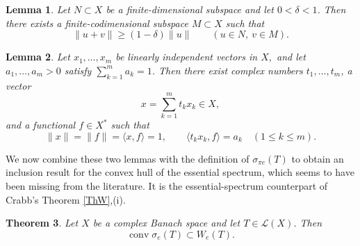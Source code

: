 \documentclass[11pt]{amsart}
\numberwithin{equation}{section}
\newtheorem{theorem}{Theorem}[section]
\newtheorem{lemma}[theorem]{Lemma}
\theoremstyle{definition}
\theoremstyle{remark}
\DeclareMathOperator{\conv}{conv}
\newcommand{\ip}[2]{\langle #1,#2\rangle}
\newcommand{\We}{W_e}
\begin{document}
\begin{lemma}\label{lem:separation-finite-codim}
Let $N\subset X$ be a finite-dimensional subspace and let $0<\delta<1$. Then there exists a finite-codimensional subspace $M\subset X$ such that
\[
\|u+v\|\ge (1-\delta)\|u\|
\qquad (u\in N,\ v\in M).
\]
\end{lemma}

\begin{lemma}\label{lem:zenger}
Let $x_1,\dots,x_m$ be linearly independent vectors in $X,$
and let $a_1,\dots,a_m>0$ satisfy $\sum_{k=1}^m a_k=1$. Then there exist complex numbers $t_1,\dots,t_m$, a vector
\[
x=\sum_{k=1}^m t_kx_k\in X,
\]
and a functional $f\in X^*$ such that
\[
\|x\|=\|f\|=\ip{x}{f}=1,
\qquad
\ip{t_kx_k}{f}=a_k
\quad (1\le k\le m).
\]
\end{lemma}

We now combine these two lemmas with the definition of $\sigma_{\pi e}(T)$ to obtain an inclusion result for the convex hull of the essential spectrum,
which seems to have been missing from the literature. 
It is the essential-spectrum counterpart of Crabb's Theorem \ref{ThW},(i).

\begin{theorem}\label{thm:convhull-sigma-pie}
Let $X$ be a complex Banach space and let $T\in \mathcal L(X)$. Then
\[
\conv\sigma_{e}(T)\subset \We(T).
\]
\end{theorem}
\end{document}

